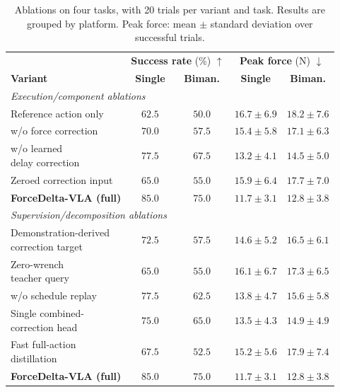 \begin{table}[t]
    \centering
    \scriptsize
    \setlength{\tabcolsep}{2pt}
    \caption{Ablations on four tasks, with 20 trials per variant and task. Results are grouped by platform. Peak force: mean $\pm$ standard deviation over successful trials.}
    \label{tab:ablation}
    \begin{tabular}{lcccc}
        \toprule
        & \multicolumn{2}{c}{\textbf{Success rate} (\%) $\uparrow$}
        & \multicolumn{2}{c}{\textbf{Peak force} (N) $\downarrow$} \\
        \cmidrule(lr){2-3}\cmidrule(lr){4-5}
        \textbf{Variant} & \textbf{Single} & \textbf{Biman.}
        & \textbf{Single} & \textbf{Biman.} \\
        \midrule
        \multicolumn{5}{l}{\emph{Execution/component ablations}} \\
        Reference action only & $62.5$ & $50.0$ & $16.7 \pm 6.9$ & $18.2 \pm 7.6$ \\
        w/o force correction & $70.0$ & $57.5$ & $15.4 \pm 5.8$ & $17.1 \pm 6.3$ \\
        \shortstack[l]{w/o learned\\delay correction} & $77.5$ & $67.5$ & $13.2 \pm 4.1$ & $14.5 \pm 5.0$ \\
        Zeroed correction input & $65.0$ & $55.0$ & $15.9 \pm 6.4$ & $17.7 \pm 7.0$ \\
        \textbf{ForceDelta-VLA (full)} & $\mathbf{85.0}$ & $\mathbf{75.0}$ & $\mathbf{11.7} \pm 3.1$ & $\mathbf{12.8} \pm 3.8$ \\
        \midrule
        \multicolumn{5}{l}{\emph{Supervision/decomposition ablations}} \\
        \shortstack[l]{Demonstration-derived\\correction target} & $72.5$ & $57.5$ & $14.6 \pm 5.2$ & $16.5 \pm 6.1$ \\
        \shortstack[l]{Zero-wrench\\teacher query} & $65.0$ & $55.0$ & $16.1 \pm 6.7$ & $17.3 \pm 6.5$ \\
        w/o schedule replay & $77.5$ & $62.5$ & $13.8 \pm 4.7$ & $15.6 \pm 5.8$ \\
        \shortstack[l]{Single combined-\\correction head} & $75.0$ & $65.0$ & $13.5 \pm 4.3$ & $14.9 \pm 4.9$ \\
        \shortstack[l]{Fast full-action\\distillation} & $67.5$ & $52.5$ & $15.2 \pm 5.6$ & $17.9 \pm 7.4$ \\
        \textbf{ForceDelta-VLA (full)} & $\mathbf{85.0}$ & $\mathbf{75.0}$ & $\mathbf{11.7} \pm 3.1$ & $\mathbf{12.8} \pm 3.8$ \\
        \bottomrule
    \end{tabular}
\end{table}

